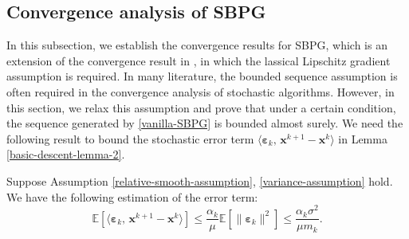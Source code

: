 \documentclass[twoside,11pt]{article}
\newcommand{\E}{\mathbb{E}}
\def\inprod#1#2{\langle#1,\,#2\rangle}
\def\vx{{\bm{x}}}
\begin{document}
\subsection{Convergence analysis of SBPG}

 In this subsection, we establish the convergence results for SBPG, which is an extension of the convergence result in \citep{ghadimi2016mini}, in which the lassical Lipschitz gradient assumption is required. In many literature, the bounded sequence assumption is often required in the convergence analysis of stochastic algorithms. However, in this section, we relax this assumption and prove that under a certain condition, the sequence generated by \eqref{vanilla-SBPG} is bounded almost surely. We need the following result to bound the stochastic error term $\inprod{{\bm\varepsilon}_k}{{\vx^{k+1}}-{\vx^k}}$ in Lemma \ref{basic-descent-lemma-2}.
\begin{lemma}
Suppose Assumption \ref{relative-smooth-assumption}, \ref{variance-assumption} hold. We have the following estimation of the error term:
\[
\mathbb E\left[\inprod{{\bm\varepsilon}_k}{{\vx^{k+1}}-{\vx^k}}\right]\leq\frac{\alpha_k}{\mu}\E[\|{\bm\varepsilon}_k\|^2]\leq\frac{\alpha_k\sigma^2}{\mu m_k}.
\]
\label{inprod-bound}
\end{lemma}
\end{document}
